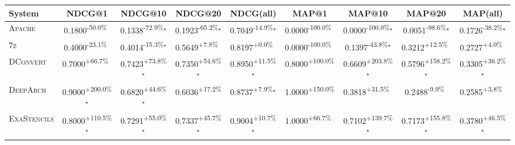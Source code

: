 \begin{table}[htbp]
\centering
\renewcommand{\arraystretch}{1.2}
\begin{tabular}{l|cccc|cccc}
\hline
System & NDCG@1 & NDCG@10 & NDCG@20 & NDCG(all) & MAP@1 & MAP@10 & MAP@20 & MAP(all) \\ \hline
\textsc{Apache} & \cellcolor{red!30}0.1800\textsuperscript{-50.0\%}$^{\,\,\,}$ & \cellcolor{red!30}0.1338\textsuperscript{-72.9\%}$^\star$ & \cellcolor{red!30}0.1923\textsuperscript{-65.2\%}$^\star$ & \cellcolor{red!30}0.7049\textsuperscript{-14.9\%}$^\star$ & \cellcolor{red!30}0.0000\textsuperscript{-100.0\%}$^{\,\,\,}$ & \cellcolor{red!30}0.0000\textsuperscript{-100.0\%}$^\star$ & \cellcolor{red!30}0.0051\textsuperscript{-98.6\%}$^\star$ & \cellcolor{red!30}0.1726\textsuperscript{-38.2\%}$^\star$ \\
\textsc{7z} & \cellcolor{red!30}0.4000\textsuperscript{-23.1\%}$^{\,\,\,}$ & \cellcolor{red!30}0.4014\textsuperscript{-15.3\%}$^\star$ & \cellcolor{green!30}0.5649\textsuperscript{+7.8\%}$^{\,\,\,}$ & \cellcolor{green!30}0.8197\textsuperscript{+0.0\%}$^{\,\,\,}$ & \cellcolor{red!30}0.0000\textsuperscript{-100.0\%}$^{\,\,\,}$ & \cellcolor{red!30}0.1397\textsuperscript{-43.8\%}$^\star$ & \cellcolor{green!30}0.3212\textsuperscript{+12.5\%}$^{\,\,\,}$ & \cellcolor{green!30}0.2727\textsuperscript{+4.0\%}$^{\,\,\,}$ \\
\textsc{DConvert} & \cellcolor{green!30}0.7000\textsuperscript{+66.7\%}$^{\,\,\,}$ & \cellcolor{green!30}0.7423\textsuperscript{+73.8\%}$^\star$ & \cellcolor{green!30}0.7350\textsuperscript{+54.6\%}$^\star$ & \cellcolor{green!30}0.8950\textsuperscript{+11.5\%}$^\star$ & \cellcolor{green!30}0.8000\textsuperscript{+100.0\%}$^{\,\,\,}$ & \cellcolor{green!30}0.6609\textsuperscript{+203.8\%}$^\star$ & \cellcolor{green!30}0.5796\textsuperscript{+158.2\%}$^\star$ & \cellcolor{green!30}0.3305\textsuperscript{+36.2\%}$^\star$ \\
\textsc{DeepArch} & \cellcolor{green!30}0.9000\textsuperscript{+200.0\%}$^\star$ & \cellcolor{green!30}0.6820\textsuperscript{+44.6\%}$^\star$ & \cellcolor{green!30}0.6036\textsuperscript{+17.2\%}$^{\,\,\,}$ & \cellcolor{green!30}0.8737\textsuperscript{+7.9\%}$^\star$ & \cellcolor{green!30}1.0000\textsuperscript{+150.0\%}$^{\,\,\,}$ & \cellcolor{green!30}0.3818\textsuperscript{+31.5\%}$^{\,\,\,}$ & \cellcolor{red!30}0.2488\textsuperscript{-9.9\%}$^{\,\,\,}$ & \cellcolor{green!30}0.2585\textsuperscript{+3.8\%}$^{\,\,\,}$ \\
\textsc{ExaStencils} & \cellcolor{green!30}0.8000\textsuperscript{+110.5\%}$^\star$ & \cellcolor{green!30}0.7291\textsuperscript{+55.0\%}$^\star$ & \cellcolor{green!30}0.7337\textsuperscript{+45.7\%}$^\star$ & \cellcolor{green!30}0.9004\textsuperscript{+10.7\%}$^\star$ & \cellcolor{green!30}1.0000\textsuperscript{+66.7\%}$^{\,\,\,}$ & \cellcolor{green!30}0.7102\textsuperscript{+139.7\%}$^\star$ & \cellcolor{green!30}0.7173\textsuperscript{+155.8\%}$^\star$ & \cellcolor{green!30}0.3780\textsuperscript{+46.5\%}$^\star$ \\

\end{tabular}
\end{table}
